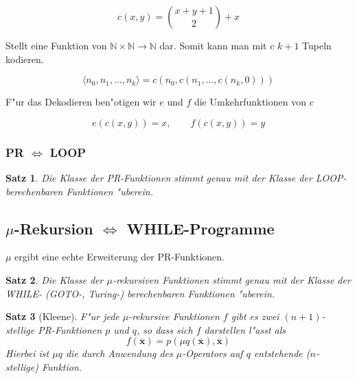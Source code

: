 \documentclass[german, 10pt, a4paper, twocolumn]{scrartcl}
\newtheorem{satz}{Satz}[section]
\theoremstyle{definition}
\theoremstyle{example}
\begin{document}
\begin{displaymath}
	c(x,y) = \binom{x+y+1}{2} + x
\end{displaymath}

Stellt eine Funktion von $\mathbb{N}\times\mathbb{N} \to \mathbb{N}$ dar. Somit kann man mit $c$ $k+1$ Tupeln kodieren.

\begin{displaymath}
	\langle n_0, n_1, \ldots, n_k \rangle = c (n_0, c(n_1, \ldots, c(n_k, 0)))
\end{displaymath}

F"ur das Dekodieren ben"otigen wir $e$ und $f$ die Umkehrfunktionen von $c$

\begin{displaymath}
	e(c(x,y)) = x, \qquad f(c(x,y)) = y
\end{displaymath}

\subsubsection{PR $\Leftrightarrow$ LOOP}

\begin{satz}
	Die Klasse der PR-Funktionen stimmt genau mit der Klasse der LOOP-berechenbaren Funktionen "uberein.
\end{satz}

\subsection{$\mu$-Rekursion $\Leftrightarrow$ WHILE-Programme}

$\mu$ ergibt eine echte Erweiterung der PR-Funktionen.

\begin{satz}
	Die Klasse der $\mu$-rekursiven Funktionen stimmt genau mit der Klasse der WHILE- (GOTO-, Turing-) berechenbaren Funktionen "uberein.
\end{satz}

\begin{satz}[Kleene]
	F"ur jede $\mu$-rekursive Funktionen $f$ gibt es zwei $(n+1)$-stellige PR-Funktionen $p$ und $q$, so dass sich $f$ darstellen l"asst als 
	\begin{displaymath}
		f(\overline{\mathbf{x}}) = p(\mu q(\overline{\mathbf{x}}), \overline{\mathbf{x}})
	\end{displaymath}
	Hierbei ist $\mu q$ die durch Anwendung des $\mu$-Operators auf $q$ entstehende ($n$-stellige) Funktion.
\end{satz}
\end{document}
